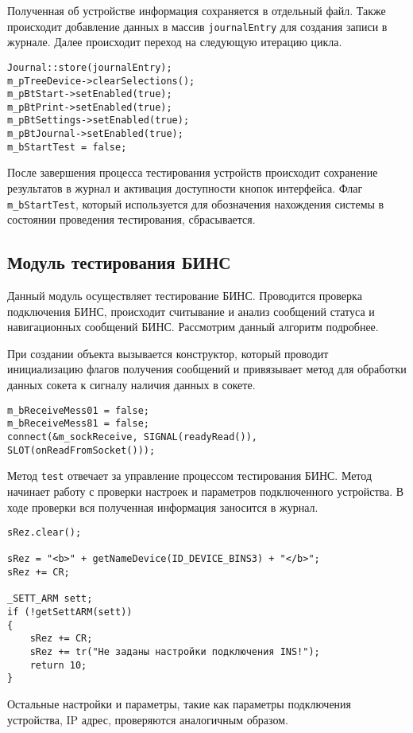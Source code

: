 Полученная об устройстве информация сохраняется в отдельный файл. Также происходит добавление данных в массив
\texttt{journalEntry} для создания записи в журнале. Далее происходит переход на следующую итерацию цикла.
\medskip
\begin{verbatim}
Journal::store(journalEntry);
m_pTreeDevice->clearSelections();
m_pBtStart->setEnabled(true);
m_pBtPrint->setEnabled(true);
m_pBtSettings->setEnabled(true);
m_pBtJournal->setEnabled(true);
m_bStartTest = false;
\end{verbatim}
\medskip

После завершения процесса тестирования устройств происходит сохранение результатов в журнал и активация доступности
кнопок интерфейса. Флаг \texttt{m\_bStartTest}, который используется для обозначения нахождения системы в состоянии
проведения тестирования, сбрасывается.

\subsection{Модуль тестирования БИНС}
Данный модуль осуществляет тестирование БИНС. Проводится проверка подключения БИНС, происходит считывание и анализ
сообщений статуса и навигационных сообщений БИНС. Рассмотрим данный алгоритм подробнее.

При создании объекта вызывается конструктор, который проводит инициализацию флагов получения сообщений и привязывает
метод для обработки данных сокета к сигналу наличия данных в сокете.
\medskip
\begin{verbatim}
m_bReceiveMess01 = false;
m_bReceiveMess81 = false;
connect(&m_sockReceive, SIGNAL(readyRead()), SLOT(onReadFromSocket()));
\end{verbatim}
\medskip

Метод \texttt{test} отвечает за управление процессом тестирования БИНС. Метод начинает работу с проверки настроек и
параметров подключенного устройства. В ходе проверки вся полученная информация заносится в журнал.
\medskip
\begin{verbatim}
sRez.clear();

sRez = "<b>" + getNameDevice(ID_DEVICE_BINS3) + "</b>";
sRez += CR;

_SETT_ARM sett;
if (!getSettARM(sett))
{
	sRez += CR;
	sRez += tr("Не заданы настройки подключения INS!");
	return 10;
}
\end{verbatim}
\medskip

Остальные настройки и параметры, такие как параметры подключения устройства, IP адрес, проверяются аналогичным образом.

